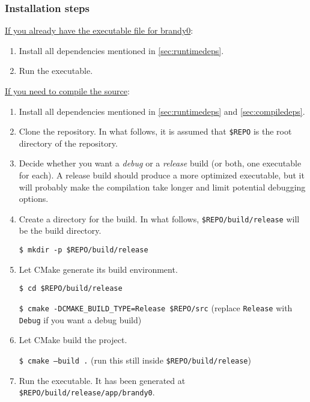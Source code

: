 \documentclass{article}
\newcommand{\icd}[1]{\texttt{#1}}
\newcommand{\ccd}[1]{\colorbox{gray!15!white}{\texttt{#1}}}
\newcommand{\scd}[1]{
	\vspace*{5pt}

	\ccd{#1}
	\vspace*{5pt}
}
\newcommand{\nscd}[1]{\scd{\$ #1}}
\newcommand{\pname}{brandy0}
\begin{document}
\subsubsection{Installation steps}
\underline{If you already have the executable file for \pname{}}:
\begin{enumerate}
	\item
		Install all dependencies mentioned in \ref{sec:runtimedeps}.
	\item
		Run the executable.
\end{enumerate}
\underline{If you need to compile the source}:
\begin{enumerate}
	\item
		Install all dependencies mentioned in \ref{sec:runtimedeps} and \ref{sec:compiledeps}.
	\item
		Clone the repository. In what follows, it is assumed that \icd{\$REPO} is the root directory of the repository.
	\item
		Decide whether you want a \emph{debug} or a \emph{release} build (or both, one executable for each). A release build should produce a more optimized executable, but it will probably make the compilation take longer and limit potential debugging options.
	\item
		Create a directory for the build. In what follows, \icd{\$REPO/build/release} will be the build directory.
		\nscd{mkdir -p \$REPO/build/release}
	\item
		Let CMake generate its build environment.
		\nscd{cd \$REPO/build/release}
		\nscd{cmake -DCMAKE\_BUILD\_TYPE=Release \$REPO/src} (replace \icd{Release} with \icd{Debug} if you want a debug build)
	\item
		Let CMake build the project.
		\nscd{cmake --build .} (run this still inside \icd{\$REPO/build/release})
	\item
		Run the executable. It has been generated at \icd{\$REPO/build/release/app/brandy0}.
\end{enumerate}

\newcommand{\inull}{start interface}
\newcommand{\Inull}{Start Interface}
\newcommand{\ione}{configuration interface}
\newcommand{\Ione}{Configuration Interface}
\newcommand{\itwo}{simulation interface}
\newcommand{\Itwo}{Simulation Interface}
\end{document}
